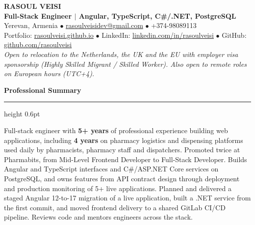\documentclass[a4paper,10pt]{article}
\newcommand{\sectionheader}[1]{%
  \vspace{6pt}%
  {\large\bfseries\color{primarycolor} #1}%
  \vspace{2pt}\hrule height 0.6pt\vspace{4pt}%
}
\begin{document}
\begin{center}
    {\huge\bfseries\color{primarycolor} RASOUL VEISI} \\[3pt]
    {\large\bfseries Full-Stack Engineer $|$ Angular, TypeScript, C\#/.NET, PostgreSQL} \\[4pt]
    Yerevan, Armenia $\bullet$ \href{mailto:rasoulveisidev@gmail.com}{rasoulveisidev@gmail.com} $\bullet$ +374-98089113 \\
    Portfolio: \href{https://rasoulveisi.github.io}{rasoulveisi.github.io} $\bullet$ LinkedIn: \href{https://www.linkedin.com/in/rasoulveisi}{linkedin.com/in/rasoulveisi} $\bullet$ GitHub: \href{https://github.com/rasoulveisi}{github.com/rasoulveisi} \\[2pt]
    {\small\textit{Open to relocation to the Netherlands, the UK and the EU with employer visa sponsorship (Highly Skilled Migrant / Skilled Worker). Also open to remote roles on European hours (UTC+4).}}
\end{center}

\sectionheader{Professional Summary}
Full-stack engineer with \textbf{5+ years} of professional experience building web applications, including \textbf{4 years} on pharmacy logistics and dispensing platforms used daily by pharmacists, pharmacy staff and dispatchers. Promoted twice at Pharmabits, from Mid-Level Frontend Developer to Full-Stack Developer. Builds Angular and TypeScript interfaces and C\#/ASP.NET Core services on PostgreSQL, and owns features from API contract design through deployment and production monitoring of 5+ live applications. Planned and delivered a staged Angular 12-to-17 migration of a live application, built a .NET service from the first commit, and moved frontend delivery to a shared GitLab CI/CD pipeline. Reviews code and mentors engineers across the stack.
\end{document}
